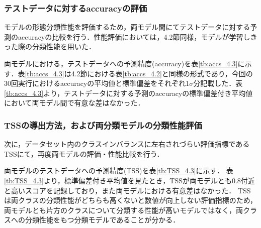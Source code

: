 \documentclass[a4j, 11pt]{jreport}
\begin{document}


\subsubsection{テストデータに対するaccuracyの評価}
モデルの形態分類性能を評価するため，両モデル間にてテストデータに対する予測のaccuracyの比較を行う．性能評価においては，4.2節同様，モデルが学習しきった際の分類性能を用いた．

両モデルにおける，テストデータへの予測精度(accuracy)を表\ref{tb:accs_4.3}に示す．表\ref{tb:accs_4.3}は4.2節における表\ref{tb:accs_4.2}と同様の形式であり，今回の30回実行におけるaccuracyの平均値と標準偏差をそれぞれ1$\sigma$分記載した．表\ref{tb:accs_4.3}より，テストデータに対する予測のaccuracyの標準偏差付き平均値において両モデル間で有意な差はなかった．

\subsubsection{TSSの導出方法，および両分類モデルの分類性能評価}
次に，データセット内のクラスインバランスに左右されづらい評価指標であるTSSにて，再度両モデルの評価・性能比較を行う．


両モデルのテストデータへの予測精度(TSS)を表\ref{tb:TSS_4.3}に示す．
表\ref{tb:TSS_4.3}より，標準偏差付き平均値を見たとき，TSSが両モデルとも0.8付近と高いスコアを記録しており，また両モデルにおける有意差はなかった．
TSSは両クラスの分類性能がどちらも高くないと数値が向上しない評価指標のため，
両モデルとも片方のクラスについて分類する性能が高いモデルではなく，両クラスへの分類性能をもつ分類モデルであることが分かる．
\end{document}
